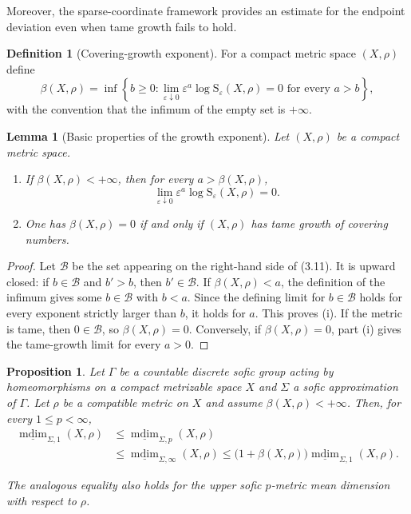 \documentclass[12pt]{amsart}
\newtheorem{proposition}[theorem]{Proposition}
\newtheorem{lemma}[theorem]{Lemma}
\theoremstyle{definition}
\newtheorem{definition}[theorem]{Definition}
\theoremstyle{remark}
\newcommand{\mdim}{\operatorname{mdim}}
\begin{document}
Moreover, the sparse-coordinate framework provides an estimate for the endpoint deviation even when tame growth fails to hold.

\begin{definition}[Covering-growth exponent]\label{def:growth-exponent}
For a compact metric space $(X,\rho)$ define
\[
 \beta(X,\rho)
 =\inf\left\{b\geq0:
 \lim_{\varepsilon\downarrow0}
 \varepsilon^a\log \mathrm{S}_\varepsilon(X,\rho)=0
 \text{ for every }a>b\right\},
 \tag{3.11}
\]
with the convention that the infimum of the empty set is $+\infty$.
\end{definition}

\begin{lemma}[Basic properties of the growth exponent]
\label{lem:beta-properties}
Let $(X,\rho)$ be a compact metric space.
\begin{enumerate}[label=\textup{(\roman*)}]
 \item If $\beta(X,\rho)<+\infty$, then for every $a>\beta(X,\rho)$,
 \[
  \lim_{\varepsilon\downarrow0}
  \varepsilon^a\log \mathrm{S}_\varepsilon(X,\rho)=0.
 \]
 \item One has $\beta(X,\rho)=0$ if and only if $(X,\rho)$ has tame growth of covering numbers.
\end{enumerate}
\end{lemma}

\begin{proof}
Let $\mathcal B$ be the set appearing on the right-hand side of (3.11). It is upward closed: if $b\in\mathcal B$ and $b'>b$, then $b'\in\mathcal B$. If $\beta(X,\rho)<a$, the definition of the infimum gives some $b\in\mathcal B$ with $b<a$. Since the defining limit for $b\in\mathcal B$ holds for every exponent strictly larger than $b$, it holds for $a$. This proves (i). If the metric is tame, then $0\in\mathcal B$, so $\beta(X,\rho)=0$. Conversely, if $\beta(X,\rho)=0$, part (i) gives the tame-growth limit for every $a>0$.
\end{proof}

\begin{proposition}
\label{prop:quantitative-comparison}
Let $\Gamma$ be a countable discrete sofic group acting by homeomorphisms on a compact metrizable
space $X$ and $\Sigma$ a sofic approximation of $\Gamma$.
Let $\rho$ be a compatible metric on $X$ and
assume $\beta(X,\rho)<+\infty$. Then, for every $1\leq p<\infty$,
\begin{align*}
  \underline{\mdim}_{\Sigma,1}(X,\rho)
 &\leq \underline{\mdim}_{\Sigma,p}(X,\rho)\\
 &\leq \underline{\mdim}_{\Sigma,\infty}(X,\rho) \leq
 \bigl(1+\beta(X,\rho)\bigr)
 \underline{\mdim}_{\Sigma,1}(X,\rho).
 \tag{3.12}   
\end{align*}


The analogous equality also holds for the upper sofic $p$-metric mean dimension with respect to  $\rho$.
\end{proposition}
\end{document}
